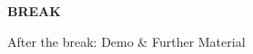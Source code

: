 \begin{frame}

\begin{center}

{\Huge \textbf{BREAK}}

\vspace{\fill}

After the break: Demo \& Further Material

\end{center}

\end{frame}
